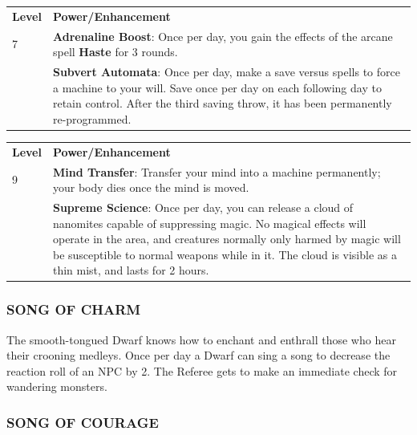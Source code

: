 \documentclass[twoside]{article}
\begin{document}
\begin{center}
\noindent\begin{tabular}{>{\centering\arraybackslash}p{}p{}}
\textbf{Level}&\textbf{Power/Enhancement}\\
\rowcolor[gray]{0.75}7&\textbf{Adrenaline Boost}: Once per day, you gain the effects of the arcane spell \textbf{Haste} for 3 rounds.\\
7&\textbf{Subvert Automata}: Once per day, make a save versus spells to force a machine to your will. Save once per day on each following day to retain control. After the third saving throw, it has been permanently re-programmed.\\
\end{tabular}
\end{center}

\begin{center}
\noindent\begin{tabular}{>{\centering\arraybackslash}p{}p{}}
\textbf{Level}&\textbf{Power/Enhancement}\\
\rowcolor[gray]{0.75}9&\textbf{Mind Transfer}: Transfer your mind into a machine permanently; your body dies once the mind is moved.\\
9&\textbf{Supreme Science}: Once per day, you can release a cloud of nanomites capable of suppressing magic. No magical effects will operate in the area, and creatures normally only harmed by magic will be susceptible to normal weapons while in it. The cloud is visible as a thin mist, and lasts for 2 hours.\\
\end{tabular}
\end{center}



\subsubsection*{\footnotesize{S}\scriptsize{ONG OF} \footnotesize{C}\scriptsize{HARM}\normalsize}

The smooth-tongued Dwarf knows how to enchant and enthrall those who hear their crooning medleys. Once per day a Dwarf can sing a song to decrease the reaction roll of an NPC by 2. The Referee gets to make an immediate check for wandering monsters.

\subsubsection*{\footnotesize{S}\scriptsize{ONG OF} \footnotesize{C}\scriptsize{OURAGE}\normalsize}
\end{document}
